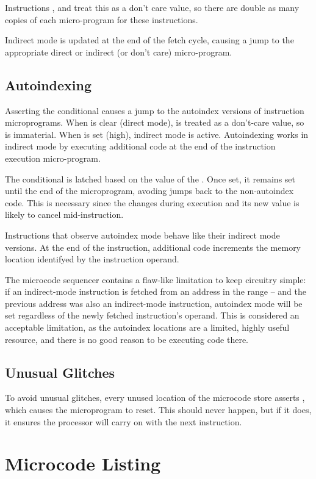 Instructions ,  and  treat this as a don't
care value, so there are double as many copies of each micro-program
for these instructions.

Indirect mode is updated at the end of the fetch cycle, causing a jump
to the appropriate direct or indirect (or don't care) micro-program.

\subsection{Autoindexing}

Asserting the  conditional causes a jump to the autoindex
versions of instruction microprograms. When  is clear (direct
mode),  is treated as a don't-care value, so is
immaterial. When  is set (high), indirect mode is
active. Autoindexing works in indirect mode by executing additional
code at the end of the instruction execution micro-program.

The  conditional is latched based on the value of the
\AR{}. Once set, it remains set until the end of the microprogram,
avoding jumps back to the non-autoindex code. This is necessary since
the \AR{} changes during execution and its new value is likely to
cancel  mid-instruction.

Instructions that observe autoindex mode behave like their indirect
mode versions. At the end of the instruction, additional code
increments the memory location identifyed by the instruction operand.

The microcode sequencer contains a flaw-like limitation to keep
circuitry simple: if an indirect-mode instruction is fetched from an
address in the range – and the previous address
was also an indirect-mode instruction, autoindex mode will be set
regardless of the newly fetched instruction's operand. This is
considered an acceptable limitation, as the autoindex locations are a
limited, highly useful resource, and there is no good reason to be
executing code there.

\subsection{Unusual Glitches}

To avoid unusual glitches, every unused location of the microcode
store asserts , which causes the microprogram to reset. This
should never happen, but if it does, it ensures the processor will
carry on with the next instruction.

\section{Microcode Listing}



